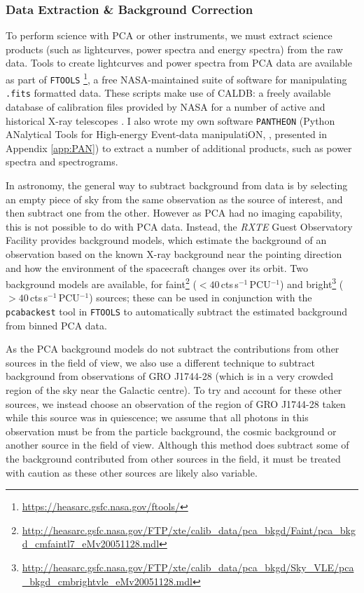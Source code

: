 \subsubsection{Data Extraction \& Background Correction}

\par To perform science with PCA or other instruments, we must extract science products (such as lightcurves, power spectra and energy spectra) from the raw data.  Tools to create lightcurves and power spectra from PCA data are available as part of \texttt{FTOOLS} \footnote{\url{https://heasarc.gsfc.nasa.gov/ftools/}}, a free NASA-maintained suite of software for manipulating \texttt{.fits} formatted data.  These scripts make use of CALDB: a freely available database of calibration files provided by NASA for a number of active and historical X-ray telescopes \citep{}.  I also wrote my own software \texttt{PANTHEON} (Python ANalytical Tools for High-energy Event-data manipulatiON, \citealp{Court_PANTHEON}, presented in Appendix \ref{app:PAN}) to extract a number of additional products, such as power spectra and spectrograms.
\par In astronomy, the general way to subtract background from data is by selecting an empty piece of sky from the same observation as the source of interest, and then subtract one from the other.  However as PCA had no imaging capability, this is not possible to do with PCA data.  Instead, the \textit{RXTE} Guest Observatory Facility provides background models, which estimate the background of an observation based on the known X-ray background near the pointing direction and how the environment of the spacecraft changes over its orbit.  Two background models are available, for faint\footnote{\url{http://heasarc.gsfc.nasa.gov/FTP/xte/calib_data/pca_bkgd/Faint/pca_bkgd_cmfaintl7_eMv20051128.mdl}} ($<40$\,cts\,s$^{-1}$\,PCU$^{-1}$) and bright\footnote{\url{http://heasarc.gsfc.nasa.gov/FTP/xte/calib_data/pca_bkgd/Sky_VLE/pca_bkgd_cmbrightvle_eMv20051128.mdl}} ($>40$\,cts\,s$^{-1}$\,PCU$^{-1}$) sources; these can be used in conjunction with the \texttt{pcabackest} tool in \texttt{FTOOLS} to automatically subtract the estimated background from binned PCA data.
\par As the PCA background models do not subtract the contributions from other sources in the field of view, we also use a different technique to subtract background from observations of GRO J1744-28 (which is in a very crowded region of the sky near the Galactic centre).  To try and account for these other sources, we instead choose an observation of the region of GRO J1744-28 taken while this source was in quiescence; we assume that all photons in this observation must be from the particle background, the cosmic background or another source in the field of view.  Although this method does subtract some of the background contributed from other sources in the field, it must be treated with caution as these other sources are likely also variable.
